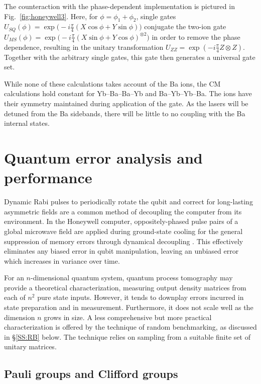 \documentclass[12pt,a4paper]{amsart}
\numberwithin{equation}{section}
\theoremstyle{plain}
\theoremstyle{definition}
\begin{document}
The counteraction with the phase-dependent implementation is pictured in Fig.~\ref{fig:honeywell3}.
Here, for $\phi=\phi_1+\phi_2$, single gates 
$
U_{SQ}(\phi)=\exp\big(-i\tfrac{\pi}{4}(X\cos\phi+Y\sin\phi)\big)
$
conjugate the two-ion gate 
$
U_{MS}(\phi)=\exp\big(-i\tfrac{\pi}{4}(X\sin\phi+Y\cos\phi)^{\otimes2}\big)
$
in order to remove the phase dependence, resulting in the unitary transformation $U_{ZZ}=\exp(-i\tfrac{\pi}{4}Z\otimes Z)$. Together with the arbitrary single gates, this gate then generates a universal gate set. 


While none of these calculations takes account of the Ba ions, the CM calculations hold constant for Yb--Ba--Ba--Yb and Ba--Yb--Yb--Ba. The ions have their symmetry maintained during application of the gate. As the lasers will be detuned from the Ba sidebands, there will be little to no coupling with the Ba internal states.



\section{Quantum error analysis and performance}


Dynamic Rabi pulses to periodically rotate the qubit and correct for long-lasting asymmetric fields are a common method of decoupling the computer from its environment. In the Honeywell computer, oppositely-phased pulse pairs of a global microwave field are applied during ground-state cooling for the general suppression of memory errors through dynamical decoupling \cite{quanDynaDeco}. This effectively eliminates any biased error in qubit manipulation, leaving an unbiased error which increases in variance over time.


For an $n$-dimensional quantum system, quantum process tomography may provide a theoretical characterization, measuring output density matrices from each of $n^2$ pure state inputs. However, it tends to downplay errors incurred in state preparation and in measurement. Furthermore, it does not scale well as the dimension $n$ grows in size. A less comprehensive but more practical characterization is offered by the technique of random benchmarking, as discussed in \S\ref{SS:RB} below. The technique relies on sampling from a suitable finite set of unitary matrices.


\subsection{Pauli groups and Clifford groups}
\end{document}
